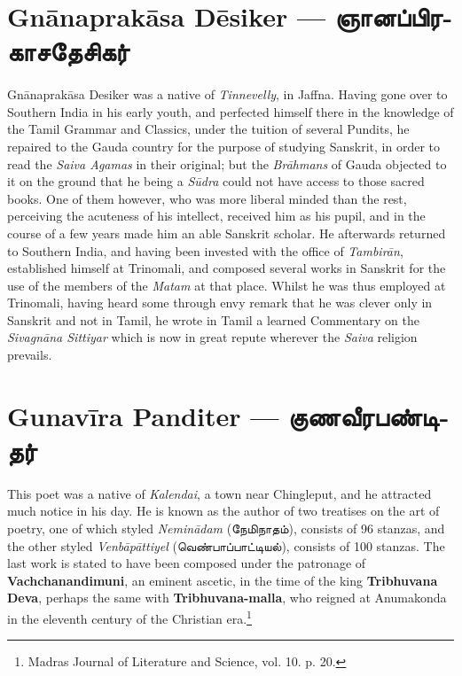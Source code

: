 \documentclass{article}
\newcommand{\TamilText}[1]{\texttamil{#1}}
\newcommand{\TamilBold}[1]{\texttamil{\textbf{#1}}}
\newcommand{\tam}[1]{\TamilText{#1}}
\newcommand{\tambold}[1]{\TamilBold{#1}}
\begin{document}
\section{Gn\={a}naprak\={a}sa D\={e}siker --- \tambold{ஞானப்பிரகாசதேசிகர்}}
\paragraph{}
Gn\={a}naprak\={a}sa Desiker was a native of \emph{Tinnevelly}, in Jaffna. Having gone over to Southern India in his early youth, and perfected himself there in the knowledge of the Tamil Grammar and Classics, under the tuition of several Pundits, he repaired to the Gauda country for the purpose of studying Sanskrit, in order to read the \emph{Saiva Agamas} in their original; but the \emph{Br\={a}hmans} of Gauda objected to it on the ground that he being a \emph{S\={u}dra} could not have access to those sacred books. One of them however, who was more liberal minded than the rest, perceiving the acuteness of his intellect, received him as his pupil, and in the course of a few years made him an able Sanskrit scholar. He afterwards returned to Southern India, and having been invested with the office of \emph{Tambir\={a}n}, established himself at Trinomali, and composed several works in Sanskrit for the use of the members of the \emph{Matam} at that place. Whilst he was thus employed at Trinomali, having heard some through envy remark that he was clever only in Sanskrit and not in Tamil, he wrote in Tamil a learned Commentary on the \emph{Sivagn\={a}na Sittiyar} which is now in great repute wherever the \emph{Saiva} religion prevails.

\section{Gunav\={i}ra Panditer --- \tambold{குணவீரபண்டிதர்}}
\paragraph{}
This poet was a native of \emph{Kalendai}, a town near Chingleput, and he attracted much notice in his day. He is known as the author of two treatises on the art of poetry, one of which styled \emph{Nemin\={a}dam} (\tam{நேமிநாதம்}), consists of 96 stanzas, and the other styled \emph{Venb\={a}p\={a}ttiyel} (\tam{வெண்பாப்பாட்டியல்}), consists of 100 stanzas. The last work is stated to have been composed under the patronage of \textbf{Vachchanandimuni}, an eminent ascetic, in the time of the king \textbf{Tribhuvana Deva}, perhaps the same with \textbf{Tribhuvana-malla}, who reigned at Anumakonda in the eleventh century of the Christian era.\footnote{Madras Journal of Literature and Science, vol. 10. p. 20.}
\end{document}
